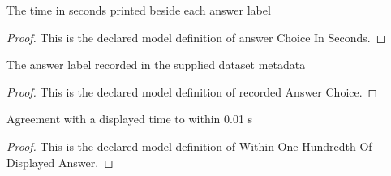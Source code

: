 \begin{definition}
  \label{def:physics:phyx-mini-0717:phyxminiproblems-problemphyxmini0717-answerchoiceinseconds}
  The time in seconds printed beside each answer label
\end{definition}
\begin{proof}
  This is the declared model definition of answer Choice In Seconds.
\end{proof}
\begin{definition}
  \label{def:physics:phyx-mini-0717:phyxminiproblems-problemphyxmini0717-recordedanswerchoice}
  The answer label recorded in the supplied dataset metadata
\end{definition}
\begin{proof}
  This is the declared model definition of recorded Answer Choice.
\end{proof}
\begin{definition}
  \label{def:physics:phyx-mini-0717:phyxminiproblems-problemphyxmini0717-withinonehundredthofdisplayedanswer}
  Agreement with a displayed time to within 0.01 s
\end{definition}
\begin{proof}
  This is the declared model definition of Within One Hundredth Of Displayed Answer.
\end{proof}

